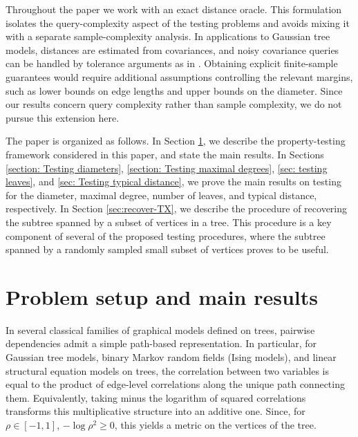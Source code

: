 \documentclass[12pt]{article}
\begin{document}

Throughout the paper we work with an exact distance oracle. This formulation isolates the query-complexity aspect of the testing problems and avoids mixing it with a separate sample-complexity analysis. In applications to Gaussian tree models, distances are estimated from covariances, and noisy covariance queries can be handled by tolerance arguments as in \cite{lugosi2021learning}. Obtaining explicit finite-sample guarantees would require additional assumptions controlling the relevant margins, such as lower bounds on edge lengths and upper bounds on the diameter. Since our results concern query complexity rather than sample complexity, we do not pursue this extension here.


The paper is organized as follows.
In Section \ref{sec: problem setup}, we describe the property-testing framework considered in this paper, and state the main results.
In Sections \ref{section: Testing diameters}, 
\ref{section: Testing maximal degrees},
\ref{sec: testing leaves}, and
\ref{sec: Testing typical distance},
we prove the main results on testing for the diameter, maximal degree, number of leaves, and typical distance, respectively. 
In Section \ref{sec:recover-TX}, we describe the procedure of recovering the subtree spanned by a subset of vertices in a tree. This procedure is a key component of several of the proposed testing procedures, where the subtree spanned by a randomly sampled small subset of vertices proves to be useful.

\section{Problem setup and main results}\label{sec: problem setup}

In several classical families of graphical models defined on trees, pairwise dependencies admit a simple path-based representation. 
In particular, for Gaussian tree models, binary Markov random fields (Ising models), and linear structural equation models on trees, the correlation between two variables is equal to the product of edge-level correlations along the unique path connecting them.
Equivalently, taking minus the logarithm of squared correlations transforms this multiplicative structure into an additive one. Since, for $\rho\in [-1,1]$, $-\log\rho^2\ge 0$, this  yields a metric on the vertices of the tree.
\end{document}

